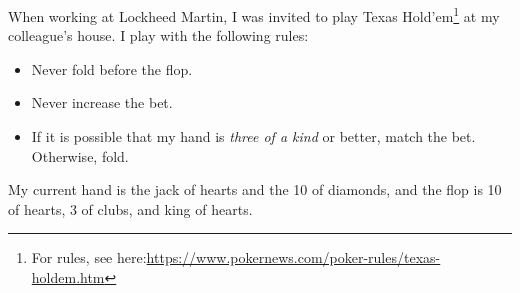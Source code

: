 \documentclass{article}
\begin{document}

When working at Lockheed Martin, I was invited to play Texas
Hold'em\footnote{For rules, see
here:\url{https://www.pokernews.com/poker-rules/texas-holdem.htm}} at my
colleague's house.  I play with the following rules:
\begin{itemize}
    \item Never fold before the flop.
    \item Never increase the bet.
    \item If it is possible that my hand is \emph{three of a kind} or better,
        match the bet.  Otherwise, fold.
\end{itemize}
My current hand is the jack of hearts and the 10 of diamonds, and the flop is 10
of hearts, 3 of clubs, and king of hearts.
\end{document}
